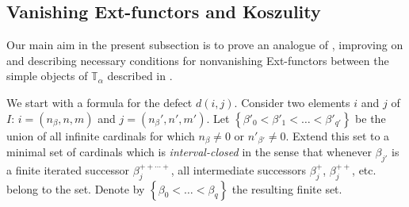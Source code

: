 \documentclass[11pt]{article}
\theoremstyle{plain}
\theoremstyle{nonumberplain}
\theoremstyle{plain}
\theoremstyle{nonumberplain}
\newcommand\bT{\mathbb T}
\begin{document}
\subsection{Vanishing Ext-functors and Koszulity}\label{se.exts}


Our main aim in the present subsection is to prove an analogue of
\cite[Theorem 3.11]{us2}, improving on  and describing necessary
conditions for nonvanishing Ext-functors between the simple
objects of $\bT_\alpha$ described in .


We start with a formula for the defect $d(i,j)$.  Consider two
elements $i$ and $j$ of $I$: $i=\left(n_\beta,n,m\right)$ and
$j=\left(n_\beta',n',m'\right)$.  Let
$\left\{\beta'_0<\beta'_1<\ldots<\beta'_{q'}\right\}$ be the union of
all infinite cardinals for which $n_\beta\neq 0$ or
$n'_{\beta'}\neq 0$.  Extend this set to a minimal set of cardinals
which is \emph{interval-closed} in the sense that whenever
$\beta_{j'}$ is a finite iterated successor $\beta_j^{++\cdots +}$,
all intermediate successors $\beta_j^+$, $\beta_j^{++}$, etc. belong
to the set.  Denote by $\left\{\beta_0<\ldots<\beta_q\right\}$ the
resulting finite set.

\end{document}
